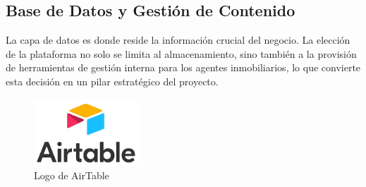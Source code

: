 \subsection{Base de Datos y Gestión de Contenido}


La capa de datos es donde reside la información crucial del negocio. La elección de la plataforma no solo se limita al almacenamiento, sino también a la provisión de herramientas de gestión interna para los agentes inmobiliarios, lo que convierte esta decisión en un pilar estratégico del proyecto.

\begin{figure}[H]
    \begin{center}
        \includegraphics[width = 0.35\textwidth]{Figuras/logoairtable.png}
    \end{center}
    \caption{\label{fig:logoairtable} Logo de AirTable}
\end{figure}


